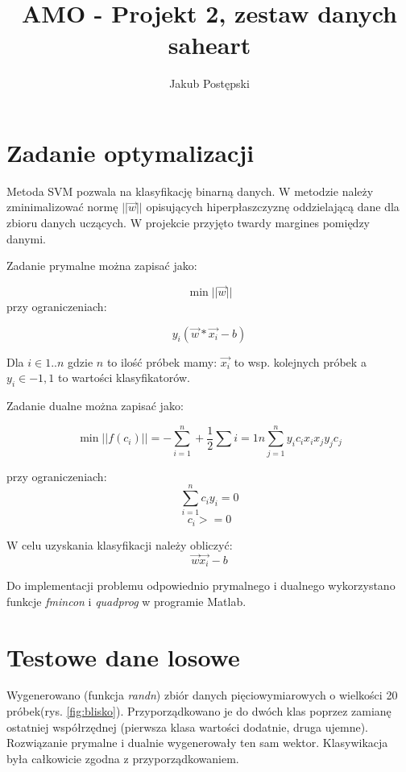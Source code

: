 \documentclass[]{article}
\title{AMO - Projekt 2, zestaw danych saheart}
\author{Jakub Postępski}
\begin{document}
\maketitle



\section{Zadanie optymalizacji}
Metoda SVM pozwala na klasyfikację binarną danych. W metodzie  należy zminimalizować normę $|| \vec{w} ||$ opisujących hiperpłaszczyznę oddzielającą dane dla zbioru danych uczących. W projekcie przyjęto twardy margines pomiędzy danymi.

Zadanie prymalne można zapisać jako:

\[ \min || \vec{w} || \]
przy ograniczeniach:

\[ y_i(\vec{w}*\vec{x_i} - b)\]

Dla $i\in {1..n}$ gdzie $n$ to ilość próbek mamy: $\vec{x_i}$ to wsp. kolejnych próbek a $y_i \in {-1, 1}$ to wartości klasyfikatorów.

Zadanie dualne można zapisać jako:

\[ \min || f(c_i) ||  = -\sum_{i=1}^{n} + \frac{1}{2}\sum{i=1}{n}\sum_{j=1}^{n}y_ic_ix_ix_jy_jc_j\]

przy ograniczeniach:
\[\sum_{i=1}^{n}c_iy_i = 0\]
\[c_i >= 0 \]


W celu uzyskania klasyfikacji należy obliczyć:
\[\vec{w}\vec{x_i}-b\]

Do implementacji problemu odpowiednio prymalnego i dualnego wykorzystano funkcje \textit{fmincon} i \textit{quadprog} w programie Matlab. 

\section{Testowe dane losowe}
Wygenerowano (funkcja \textit{randn}) zbiór danych pięciowymiarowych o wielkości 20 próbek(rys. \ref{fig:blisko}). Przyporządkowano je do dwóch klas poprzez zamianę ostatniej współrzędnej (pierwsza klasa wartości dodatnie, druga ujemne). Rozwiązanie prymalne i dualnie wygenerowały ten sam wektor. Klasywikacja była całkowicie zgodna z przyporządkowaniem.
\end{document}
